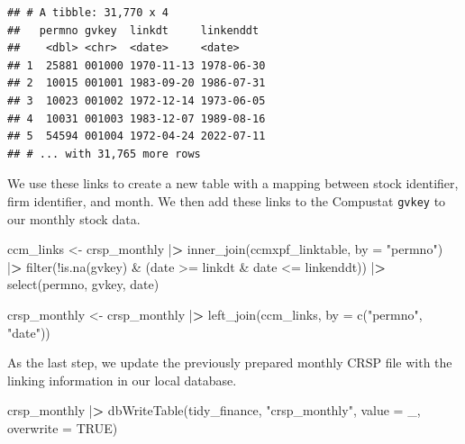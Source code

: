 \documentclass[
]{book}
\newenvironment{Shaded}{\begin{snugshade}}{\end{snugshade}}
\newcommand{\AttributeTok}[1]{\textcolor[rgb]{0.61,0.61,0.61}{#1}}
\newcommand{\ConstantTok}[1]{\textcolor[rgb]{0,0,0}{#1}}
\newcommand{\ErrorTok}[1]{\textcolor[rgb]{0.14,0.14,0.14}{\textbf{#1}}}
\newcommand{\FunctionTok}[1]{\textcolor[rgb]{0,0,0}{#1}}
\newcommand{\NormalTok}[1]{#1}
\newcommand{\OtherTok}[1]{\textcolor[rgb]{0.37,0.37,0.37}{#1}}
\newcommand{\SpecialCharTok}[1]{\textcolor[rgb]{0,0,0}{#1}}
\newcommand{\StringTok}[1]{\textcolor[rgb]{0.5,0.5,0.5}{#1}}
\begin{document}
\begin{verbatim}
## # A tibble: 31,770 x 4
##   permno gvkey  linkdt     linkenddt 
##    <dbl> <chr>  <date>     <date>    
## 1  25881 001000 1970-11-13 1978-06-30
## 2  10015 001001 1983-09-20 1986-07-31
## 3  10023 001002 1972-12-14 1973-06-05
## 4  10031 001003 1983-12-07 1989-08-16
## 5  54594 001004 1972-04-24 2022-07-11
## # ... with 31,765 more rows
\end{verbatim}

We use these links to create a new table with a mapping between stock identifier, firm identifier, and month. We then add these links to the Compustat \texttt{gvkey} to our monthly stock data.

\begin{Shaded}
\begin{Highlighting}[]
\NormalTok{ccm\_links }\OtherTok{\textless{}{-}}\NormalTok{ crsp\_monthly }\SpecialCharTok{|}\ErrorTok{\textgreater{}}
  \FunctionTok{inner\_join}\NormalTok{(ccmxpf\_linktable, }\AttributeTok{by =} \StringTok{"permno"}\NormalTok{) }\SpecialCharTok{|}\ErrorTok{\textgreater{}}
  \FunctionTok{filter}\NormalTok{(}\SpecialCharTok{!}\FunctionTok{is.na}\NormalTok{(gvkey) }\SpecialCharTok{\&}\NormalTok{ (date }\SpecialCharTok{\textgreater{}=}\NormalTok{ linkdt }\SpecialCharTok{\&}\NormalTok{ date }\SpecialCharTok{\textless{}=}\NormalTok{ linkenddt)) }\SpecialCharTok{|}\ErrorTok{\textgreater{}}
  \FunctionTok{select}\NormalTok{(permno, gvkey, date)}

\NormalTok{crsp\_monthly }\OtherTok{\textless{}{-}}\NormalTok{ crsp\_monthly }\SpecialCharTok{|}\ErrorTok{\textgreater{}}
  \FunctionTok{left\_join}\NormalTok{(ccm\_links, }\AttributeTok{by =} \FunctionTok{c}\NormalTok{(}\StringTok{"permno"}\NormalTok{, }\StringTok{"date"}\NormalTok{))}
\end{Highlighting}
\end{Shaded}

As the last step, we update the previously prepared monthly CRSP file with the linking information in our local database.

\begin{Shaded}
\begin{Highlighting}[]
\NormalTok{crsp\_monthly }\SpecialCharTok{|}\ErrorTok{\textgreater{}}
  \FunctionTok{dbWriteTable}\NormalTok{(tidy\_finance, }
               \StringTok{"crsp\_monthly"}\NormalTok{, }
               \AttributeTok{value =}\NormalTok{ \_, }
               \AttributeTok{overwrite =} \ConstantTok{TRUE}\NormalTok{)}
\end{Highlighting}
\end{Shaded}
\end{document}
